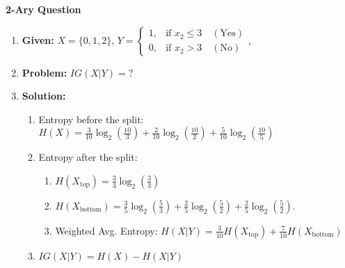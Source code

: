 \begin{example} \textbf{2-Ary Question}
    \begin{enumerate}
        \item \textbf{Given:} $X= \{0,1,2\}$, $Y = 
        \begin{cases} 
        1, & \text{if } x_2 \leq 3 \quad (\text{Yes}) \\
        0, & \text{if } x_2 > 3 \quad (\text{No})
        \end{cases}$, 
        \item \textbf{Problem:} $IG(X|Y) = ?$
        \item \textbf{Solution:}
        \begin{enumerate}
            \item Entropy before the split: $H(X) = \frac{3}{10} \log_2\left(\frac{10}{3}\right) + \frac{2}{10} \log_2\left(\frac{10}{2}\right) + \frac{5}{10} \log_2\left(\frac{10}{5}\right)$
            \item Entropy after the split: 
            \begin{enumerate}
                \item $H(X_{\text{top}}) = \frac{3}{3} \log_2 \left(\frac{3}{3}\right)$ 
                \item $H(X_{\text{bottom}}) = \frac{3}{5} \log_2 \left(\frac{5}{3}\right) + \frac{2}{5} \log_2 \left(\frac{5}{2}\right)+ \frac{2}{5} \log_2 \left(\frac{5}{2}\right)$.
                \item Weighted Avg. Entropy: $H(X|Y) = \frac{3}{10} H(X_{\text{top}}) + \frac{7}{10} H(X_{\text{bottom}})$
            \end{enumerate}
            \item $IG(X|Y) = H(X) - H(X|Y)$
        \end{enumerate}
    \end{enumerate}
\end{example}

